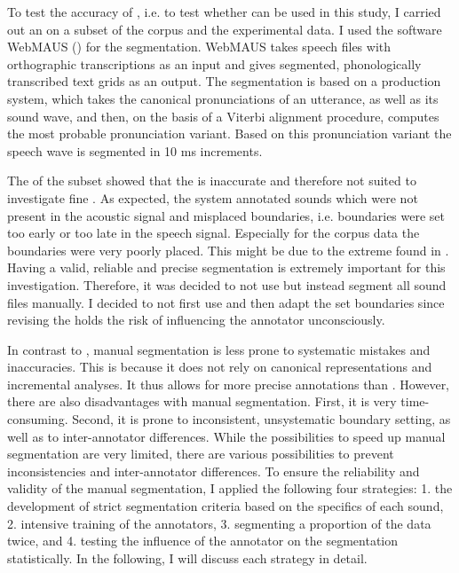 To test the accuracy of , i.e. to test whether  can be used in this study, I carried out an  on a subset of the corpus and the experimental data. I used the software WebMAUS (\citealt{Schiel.1999,Kisler.2016}) for the segmentation.  WebMAUS takes speech files with orthographic transcriptions as an input and gives segmented, phonologically transcribed text grids as an output. The segmentation is based on a production system, which takes the canonical pronunciations of an utterance, as well as its sound wave, and then, on the basis of a Viterbi alignment procedure, computes the most probable pronunciation variant. Based on this pronunciation variant the speech wave is segmented in 10 ms increments. 
 
 
 The  of the subset showed that the  is inaccurate and therefore not suited to investigate fine . As expected, the system annotated sounds which were not present in the acoustic signal and misplaced boundaries, i.e. boundaries were set too early or too late in the speech signal. Especially for the corpus data the boundaries were very poorly placed. This might be due to the extreme  found in . 
 Having a valid, reliable and precise segmentation is extremely important for this investigation. Therefore, it was decided to not use  but instead segment all sound files manually. I decided to not first use  and then adapt the set boundaries since revising the  holds the risk of influencing the annotator unconsciously. 
 

In contrast to , manual segmentation is less prone to systematic mistakes and inaccuracies. This is because it does not rely on canonical representations and incremental analyses. It thus allows for more precise annotations than .  However, there are also disadvantages with manual segmentation. 
First, it is very time-consuming. Second, it is prone to inconsistent, unsystematic boundary setting, as well as to inter-annotator differences. While the possibilities to speed up manual segmentation are very limited, there are various possibilities to prevent inconsistencies and inter-annotator differences. To ensure the reliability and validity of the manual segmentation, I applied the following four strategies: 1.  the development of strict segmentation criteria based on the specifics of each sound, 2.  intensive training of the annotators, 3. segmenting a proportion of the data twice, and 4. testing the influence of the annotator on the segmentation statistically. In the following, I will discuss each strategy in detail.


